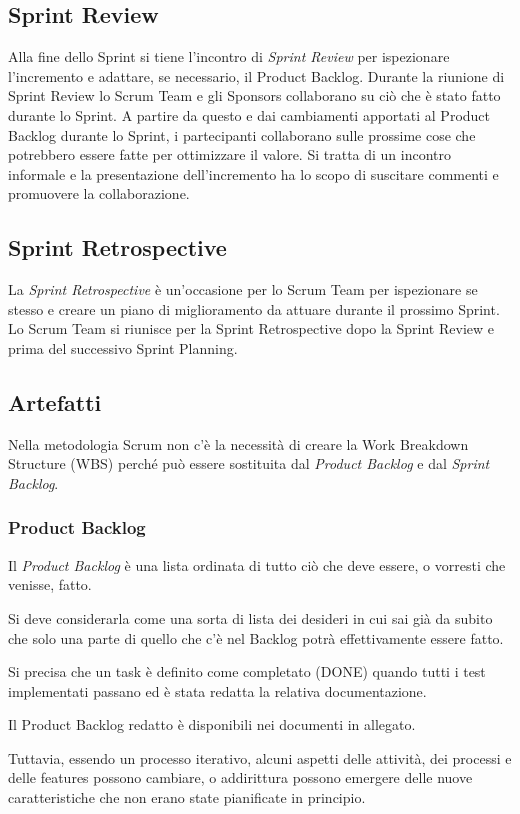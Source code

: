 \documentclass{article}
\begin{document}
\subsection{Sprint Review}
Alla fine dello Sprint si tiene l'incontro di \textit{Sprint Review} per ispezionare l'incremento e adattare, se
necessario, il Product Backlog. Durante la riunione di Sprint Review lo Scrum Team e gli Sponsors
collaborano su ciò che è stato fatto durante lo Sprint. A partire da questo e dai cambiamenti apportati al
Product Backlog durante lo Sprint, i partecipanti collaborano sulle prossime cose che potrebbero essere
fatte per ottimizzare il valore. Si tratta di un incontro informale e la presentazione dell'incremento ha lo
scopo di suscitare commenti e promuovere la collaborazione.

\subsection{Sprint Retrospective}
La \textit{Sprint Retrospective} è un'occasione per lo Scrum Team per ispezionare se stesso e creare un piano di
miglioramento da attuare durante il prossimo Sprint. Lo Scrum Team si riunisce per la Sprint Retrospective dopo 
la Sprint Review e prima del successivo Sprint Planning.

\newpage
\subsection{Artefatti}
Nella metodologia Scrum non c'è la necessità di creare la Work Breakdown Structure (WBS) 
perché può essere sostituita dal \textit{Product Backlog} e dal \textit{Sprint Backlog}.

\subsubsection{Product Backlog}
Il \textit{Product Backlog} è una lista ordinata di tutto ciò che deve essere, o vorresti che venisse, fatto.

Si deve considerarla come una sorta di lista dei desideri in cui sai già da subito che solo una
parte di quello che c'è nel Backlog potrà effettivamente essere fatto.

Si precisa che un task è definito come completato (DONE) quando tutti i test implementati passano 
ed è stata redatta la relativa documentazione.

Il Product Backlog redatto è disponibili nei documenti in allegato.

Tuttavia, essendo un processo iterativo, alcuni aspetti delle attività, dei processi e delle features 
possono cambiare, o addirittura possono emergere delle nuove caratteristiche che non erano state 
pianificate in principio.
\end{document}
